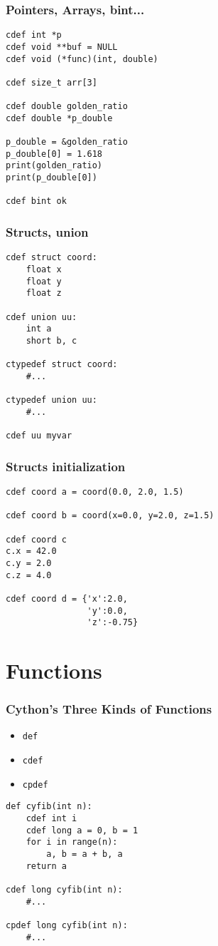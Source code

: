 \documentclass{beamer}
\begin{document}
\begin{frame}[fragile]
  \frametitle{Pointers, Arrays, bint...}
    \begin{lstlisting}
cdef int *p
cdef void **buf = NULL
cdef void (*func)(int, double)

cdef size_t arr[3]

cdef double golden_ratio
cdef double *p_double

p_double = &golden_ratio
p_double[0] = 1.618
print(golden_ratio)
print(p_double[0])

cdef bint ok
    \end{lstlisting}
\end{frame}

\begin{frame}[fragile]
  \frametitle{Structs, union}
    \begin{lstlisting}
cdef struct coord:
    float x
    float y
    float z

cdef union uu:
    int a
    short b, c

ctypedef struct coord:
    #...

ctypedef union uu:
    #...

cdef uu myvar
    \end{lstlisting}
\end{frame}

\begin{frame}[fragile]
  \frametitle{Structs initialization}
    \begin{lstlisting}
cdef coord a = coord(0.0, 2.0, 1.5)

cdef coord b = coord(x=0.0, y=2.0, z=1.5)

cdef coord c
c.x = 42.0
c.y = 2.0
c.z = 4.0

cdef coord d = {'x':2.0,
                'y':0.0,
                'z':-0.75}
    \end{lstlisting}
\end{frame}


\section{Functions}

\begin{frame}[fragile]
  \frametitle{Cython's Three Kinds of Functions}
    \begin{itemize}
      \item \lstinline{def}
      \item \lstinline{cdef}
      \item \lstinline{cpdef}
    \end{itemize}
    \begin{lstlisting}
def cyfib(int n):
    cdef int i
    cdef long a = 0, b = 1
    for i in range(n):
        a, b = a + b, a
    return a

cdef long cyfib(int n):
    #...

cpdef long cyfib(int n):
    #...
    \end{lstlisting}
\end{frame}
\end{document}
